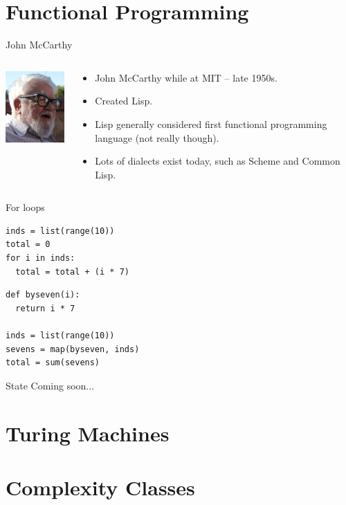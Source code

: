 \section{Functional Programming}
\begin{frame}{John McCarthy}
  \begin{columns}
    \begin{column}{0.2\textwidth}
      \includegraphics[width=1.2in]{img/john-mccarthy.png}
    \end{column}
    \begin{column}{0.7\textwidth}
      \begin{itemize}
        \item John McCarthy while at MIT -- late 1950s.
        \vspace{0.25cm}
        \item Created Lisp.
        \vspace{0.25cm}
        \item Lisp generally considered first functional programming language (not really though).
        \vspace{0.25cm}
        \item Lots of dialects exist today, such as Scheme and Common Lisp.
      \end{itemize}
    \end{column}
  \end{columns}
\end{frame}

\begin{frame}[fragile]{For loops}
  \begin{verbatim}
inds = list(range(10))
total = 0
for i in inds:
  total = total + (i * 7)
  \end{verbatim}
  \begin{verbatim}
def byseven(i):
  return i * 7

inds = list(range(10))
sevens = map(byseven, inds)
total = sum(sevens)
  \end{verbatim}
\end{frame}

\begin{frame}{State}
Coming soon...
\end{frame}


\section{Turing Machines}

\section{Complexity Classes}
